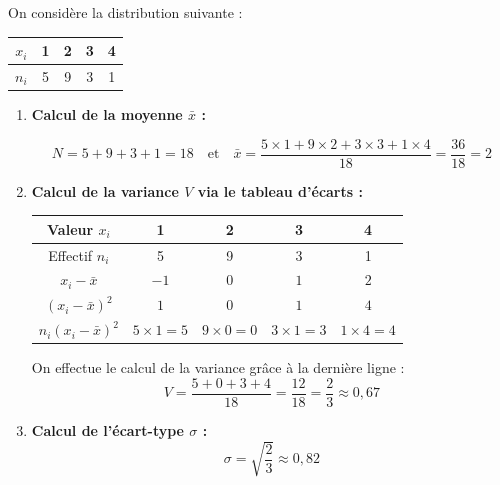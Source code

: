 \begin{methode}
	On considère la distribution suivante :
	\begin{center}
		\begin{tabular}{|c|c|c|c|c|} \hline
			\cellcolor{gray!30} $x_i$ & 1 & 2 & 3 & 4 \\ \hline
			\cellcolor{gray!30} $n_i$ & 5 & 9 & 3 & 1 \\ \hline
		\end{tabular}
	\end{center}

	\begin{correction}
		\nline
		\begin{enumerate}
			\item \textbf{Calcul de la moyenne $\bar{x}$ :}

			      \[
				      N = 5 + 9 + 3 + 1 = 18 \quad \text{et} \quad \bar{x} = \dfrac{5 \times 1 + 9 \times 2 + 3 \times 3 + 1 \times 4}{18} = \dfrac{36}{18} = 2
			      \]

			\item \textbf{Calcul de la variance $V$ via le tableau d'écarts :}
			      \ms
			      \begin{center}
				      \begin{tabular}{|c|c|c|c|c|} \hline
					      \cellcolor{gray!30} Valeur $x_i$           & 1                & 2                & 3                & 4                \\ \hline
					      \cellcolor{gray!30} Effectif $n_i$         & 5                & 9                & 3                & 1                \\ \hline
					      \cellcolor{gray!30} $x_i - \bar{x}$        & $-1$             & $0$              & $1$              & $2$              \\ \hline
					      \cellcolor{gray!30} $(x_i - \bar{x})^2$    & $1$              & $0$              & $1$              & $4$              \\ \hline
					      \cellcolor{gray!30} $n_i(x_i - \bar{x})^2$ & $5 \times 1 = 5$ & $9 \times 0 = 0$ & $3 \times 1 = 3$ & $1 \times 4 = 4$ \\ \hline
				      \end{tabular}
			      \end{center}

			      \ms

			      On effectue le calcul de la variance grâce à la dernière ligne :
			      \[
				      V = \dfrac{5 + 0 + 3 + 4}{18} = \dfrac{12}{18} = \dfrac{2}{3} \approx 0{,}67
			      \]

			\item \textbf{Calcul de l'écart-type $\sigma$ :}
			      \[
				      \sigma = \sqrt{\dfrac{2}{3}} \approx 0{,}82
			      \]
		\end{enumerate}
	\end{correction}
\end{methode}

